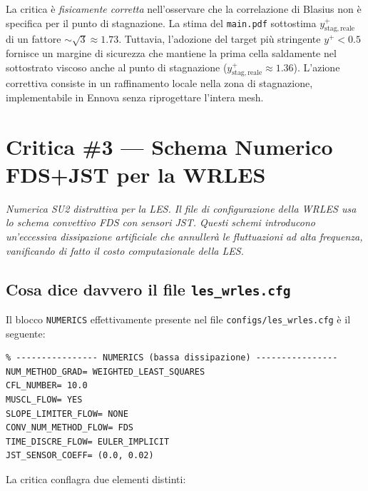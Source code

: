\documentclass[11pt,a4paper]{article}
\begin{document}
\begin{verdettoparz}
La critica è \emph{fisicamente corretta} nell'osservare che la
correlazione di Blasius non è specifica per il punto di
stagnazione. La stima del \texttt{main.pdf} sottostima
$y^{+}_{\mathrm{stag,reale}}$ di un fattore $\sim\sqrt{3}\approx
1.73$. Tuttavia, l'adozione del target più stringente $y^{+}<0.5$
fornisce un margine di sicurezza che mantiene la prima cella
saldamente nel sottostrato viscoso anche al punto di stagnazione
($y^{+}_{\mathrm{stag,reale}}\approx 1.36$). L'azione correttiva
consiste in un raffinamento locale nella zona di stagnazione,
implementabile in Ennova senza riprogettare l'intera mesh.
\end{verdettoparz}

\section{Critica \#3 — Schema Numerico FDS+JST per la WRLES}
\label{sec:c3}

\begin{citazione}
\textit{Numerica SU2 distruttiva per la LES. Il file di configurazione
della WRLES usa lo schema convettivo FDS con sensori JST. Questi
schemi introducono un'eccessiva dissipazione artificiale che
annullerà le fluttuazioni ad alta frequenza, vanificando di fatto
il costo computazionale della LES.}
\end{citazione}

\subsection{Cosa dice davvero il file \texttt{les\_wrles.cfg}}

Il blocco \texttt{NUMERICS} effettivamente presente nel file
\texttt{configs/les\_wrles.cfg} è il seguente:

\begin{lstlisting}
% ---------------- NUMERICS (bassa dissipazione) ----------------
NUM_METHOD_GRAD= WEIGHTED_LEAST_SQUARES
CFL_NUMBER= 10.0
MUSCL_FLOW= YES
SLOPE_LIMITER_FLOW= NONE
CONV_NUM_METHOD_FLOW= FDS
TIME_DISCRE_FLOW= EULER_IMPLICIT
JST_SENSOR_COEFF= (0.0, 0.02)
\end{lstlisting}

La critica conflagra due elementi distinti:
\end{document}
